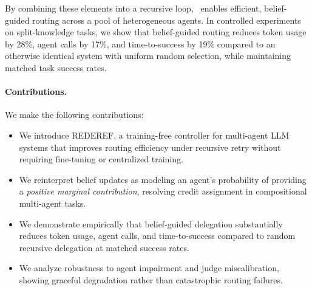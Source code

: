 By combining these elements into a recursive loop, \method\ enables efficient, belief-guided routing across a pool of heterogeneous agents. In controlled experiments on split-knowledge tasks, we show that belief-guided routing reduces token usage by 28\%, agent calls by 17\%, and time-to-success by 19\% compared to an otherwise identical system with uniform random selection, while maintaining matched task success rates.

\paragraph{Contributions.}
We make the following contributions:
\begin{itemize}
    \item We introduce \textsc{REDEREF}, a training-free controller for multi-agent LLM systems that
    improves routing efficiency under recursive retry without requiring fine-tuning or centralized training.
    \item We reinterpret belief updates as modeling an agent's probability of providing a
    \emph{positive marginal contribution}, resolving credit assignment in compositional multi-agent tasks.
    \item We demonstrate empirically that belief-guided delegation substantially reduces token usage,
    agent calls, and time-to-success compared to random recursive delegation at matched success rates.
    \item We analyze robustness to agent impairment and judge miscalibration, showing graceful
    degradation rather than catastrophic routing failures.
\end{itemize}
